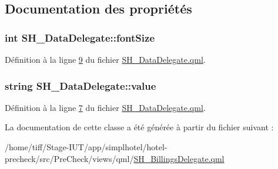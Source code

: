 \subsection{Documentation des propriétés}
\hypertarget{classSH__DataDelegate_afbb41ad9b513c7f27e7b5ad90d82e95b}{
\subsubsection[{font\-Size}]{\setlength{\rightskip}{0pt plus 5cm}int S\-H\-\_\-\-Data\-Delegate\-::font\-Size\hspace{0.3cm}{\ttfamily [inherited]}}}\label{classSH__DataDelegate_afbb41ad9b513c7f27e7b5ad90d82e95b}


Définition à la ligne \hyperlink{SH__DataDelegate_8qml_source_l00009}{9} du fichier \hyperlink{SH__DataDelegate_8qml_source}{S\-H\-\_\-\-Data\-Delegate.\-qml}.

\hypertarget{classSH__DataDelegate_acb9da3c73493c88865e08d9575f26482}{
\subsubsection[{value}]{\setlength{\rightskip}{0pt plus 5cm}string S\-H\-\_\-\-Data\-Delegate\-::value\hspace{0.3cm}{\ttfamily [inherited]}}}\label{classSH__DataDelegate_acb9da3c73493c88865e08d9575f26482}


Définition à la ligne \hyperlink{SH__DataDelegate_8qml_source_l00007}{7} du fichier \hyperlink{SH__DataDelegate_8qml_source}{S\-H\-\_\-\-Data\-Delegate.\-qml}.



La documentation de cette classe a été générée à partir du fichier suivant \-:\begin{DoxyCompactItemize}
\item 
/home/tiff/\-Stage-\/\-I\-U\-T/app/simplhotel/hotel-\/precheck/src/\-Pre\-Check/views/qml/\hyperlink{SH__BillingsDelegate_8qml}{S\-H\-\_\-\-Billings\-Delegate.\-qml}\end{DoxyCompactItemize}
